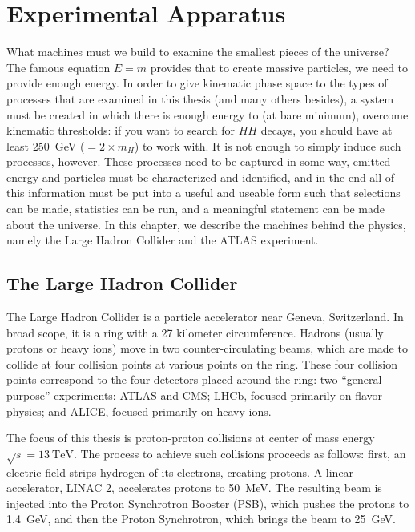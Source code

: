 \chapter{Experimental Apparatus}
\label{chap:experiment}

What machines must we build to examine the smallest pieces of the universe? The famous equation 
$E = m$ provides that to create massive particles, we need to provide enough energy. In order to give 
kinematic phase space to the types of processes that are examined in this thesis (and many others besides),
a system must be created in which there is enough energy to (at bare minimum), overcome kinematic thresholds:
if you want to search for $HH$ decays, you should have at least \SI{250}{\GeV} ($= 2\times m_{H}$) to work with.
It is not enough to simply induce such processes, however. These processes need to be captured in some way, emitted 
energy and particles must be characterized and identified, and in the end all of this information must be put into a 
useful and useable form such that selections can be made, statistics can be run, and a meaningful statement 
can be made about the universe. In this chapter, we describe the machines behind the physics, namely the Large 
Hadron Collider and the ATLAS experiment.

\section{The Large Hadron Collider}
The Large Hadron Collider is a particle accelerator near Geneva, Switzerland. In broad scope, it is a 
ring with a 27 kilometer circumference. Hadrons (usually protons or heavy ions) move in two 
counter-circulating beams, which are made to collide at four collision points at various 
points on the ring. These four collision points correspond to the four detectors placed 
around the ring: two ``general purpose'' experiments: ATLAS and CMS; LHCb, focused primarily 
on flavor physics; and ALICE, focused primarily on heavy ions.

The focus of this thesis is proton-proton collisions at center of mass energy $\sqrt{s}=\SI{13}{\TeV}$. 
The process to achieve such collisions proceeds as follows:
first, an electric field strips hydrogen of its electrons, creating protons. A linear accelerator,
LINAC 2, accelerates protons to \SI{50}{\MeV}. The resulting beam is injected into the Proton 
Synchrotron Booster (PSB), which pushes the protons to \SI{1.4}{\GeV}, and then the Proton Synchrotron,
which brings the beam to \SI{25}{\GeV}.

